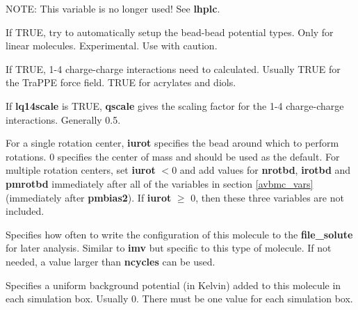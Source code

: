 \documentclass[12pt,letterpaper]{article}
\begin{document}
 NOTE: This variable is no longer used! See {\bf lhplc}.





 If TRUE, try to automatically setup
the bead-bead potential types. Only for linear molecules.
Experimental. Use with caution.

 If TRUE, 1-4 charge-charge
interactions need to calculated. Usually TRUE for the TraPPE
force field. TRUE for acrylates and diols.

 If {\bf lq14scale} is TRUE, {\bf
  qscale} gives the scaling factor for the 1-4 charge-charge
interactions. Generally 0.5.

 For a single rotation center, {\bf
  iurot} specifies the bead around which to perform
rotations. 0 specifies the center of mass and should be used
as the default. For multiple rotation centers, set {\bf
  iurot} $< 0$ and add values for \textbf{nrotbd},
\textbf{irotbd} and \textbf{pmrotbd} immediately after all
of the variables in section \ref{avbmc_vars} (immediately
after {\bf pmbias2}). If {\bf iurot} $\ge$ 0, then these
three variables are not included.

 Specifies how often to write the
configuration of this molecule to the {\bf file\_solute} for
later analysis. Similar to {\bf imv} but specific to this
type of molecule. If not needed, a value larger than {\bf
  ncycles} can be used.

 Specifies a uniform background potential
(in Kelvin) added to this molecule in each simulation box.
Usually 0. There must be one value for each simulation box.
\end{document}
